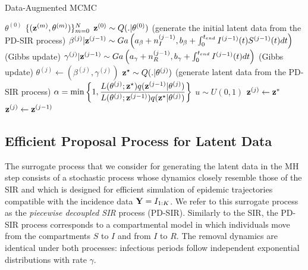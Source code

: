 \documentclass[11pt]{article}
\begin{document}
	\begin{algorithm}
		\caption{Data-Augmented MCMC}
		\label{alg:DA-MCMC}
		\begin{algorithmic}
			\REQUIRE $\theta^{(0)}$
			\RETURN $\{(\mathbf{z}^{(m)}, \theta^{(m)})\}_{m=0}^N$ 
			\STATE $\mathbf{z}^{(0)} \sim Q(.|\theta^{(0)})$ (generate the initial latent data from the PD-SIR process)
			\STATE $\beta^{(j)}|\mathbf{z}^{(j - 1)} \sim Ga\left( a_{\beta} + n_I^{(j - 1)}, b_{\beta} + \int_{0}^{t_{end}} I^{(j - 1)}(t)S^{(j - 1)}(t)dt\right)$ (Gibbs update)
			\STATE $\gamma^{(j)}|\mathbf{z}^{(j-1)} \sim Ga\left( a_{\gamma} + n_R^{(j - 1)}, b_{\gamma} + \int_{0}^{t_{end}} I^{(j - 1)}(t) dt\right)$ (Gibbs update)
			\STATE $\theta^{(j)} \leftarrow (\beta^{(j)}, \gamma^{(j)})$
			\STATE $\mathbf{z}^\star \sim Q(.|\theta^{(j)})$ (generate latent data from the PD-SIR process)
			\STATE $\alpha = \min\left\lbrace 1, \dfrac{L(\theta^{(j)}; \mathbf{z}^\star)q(\mathbf{z}^{(j - 1)}|\theta^{(j)})}{L(\theta^{(j)}; \mathbf{z}^{(j - 1)})q(\mathbf{z}^\star|\theta^{(j)})}\right\rbrace  $
			\STATE $u \sim U(0,1)$
			\STATE $\mathbf{z}^{(j)} \leftarrow \mathbf{z}^*$			
			\ELSE
			\STATE $\mathbf{z}^{(j)} \leftarrow \mathbf{z}^{(j - 1)}$
			\ENDIF
			\ENDFOR
		\end{algorithmic}
	\end{algorithm}
	
	\subsection{Efficient Proposal Process for Latent Data}
	\label{sec:pds}

	The surrogate process that we consider for generating the latent data in the MH step consists of a stochastic process whose dynamics closely resemble those of the SIR and which is designed for efficient simulation of epidemic trajectories compatible with the incidence data $\mathbf{Y} = I_{1:K}$. We refer to this surrogate process as the \textit{piecewise decoupled SIR} process (PD-SIR).
	Similarly to the SIR, the PD-SIR process corresponds to a compartmental model in which individuals move from the compartments $S$ to $I$ and from $I$ to $R$.
	The removal dynamics are identical under both processes: infectious periods follow independent exponential distributions with rate $\gamma$.
	
\end{document}

